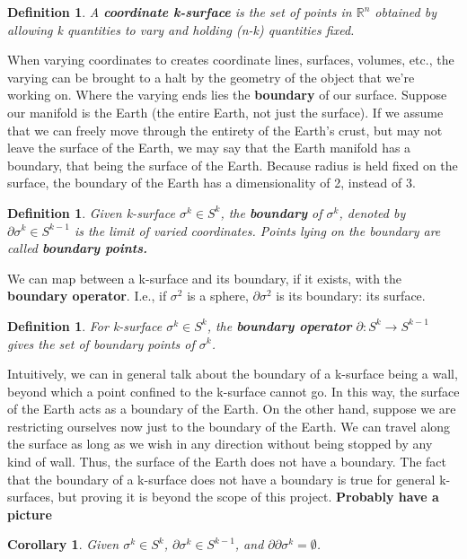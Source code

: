 \documentclass{book}
\newtheorem{defn}[equation]{Definition}
\newtheorem{coro}[equation]{Corollary}
\begin{document}
\begin{defn}
	A \textbf{coordinate k-surface} is the set of points in $\mathbb{R}^n$ obtained by allowing k quantities to vary and holding (n-k) quantities fixed.  
\end{defn}

When varying coordinates to creates coordinate lines, surfaces, volumes, etc., the varying can be brought to a halt by the geometry of the object that we're working on. Where the varying ends lies the \textbf{boundary} of our surface. Suppose our manifold is the Earth (the entire Earth, not just the surface). If we assume that we can freely move through the entirety of the Earth's crust, but may not leave the surface of the Earth, we may say that the Earth manifold has a boundary, that being the surface of the Earth. Because radius is held fixed on the surface, the boundary of the Earth has a dimensionality of 2, instead of 3. 

\begin{defn}
	Given k-surface $\sigma^k \in S^k$, the \textbf{boundary} of $\sigma^k$, denoted by $\partial\sigma^k \in S^{k-1}$ is the limit of varied coordinates. Points lying on the boundary are called \textbf{boundary points.}
\end{defn}

We can map between a k-surface and its boundary, if it exists, with the \textbf{boundary operator}. I.e., if $\sigma^2$ is a sphere, $\partial \sigma^2$ is its boundary: its surface. 

\begin{defn}
	For k-surface $\sigma^k \in S^k$, the \textbf{boundary operator} $\partial : S^k \to S^{k-1}$ gives the set of boundary points of $\sigma^k$. 
\end{defn}

Intuitively, we can in general talk about the boundary of a k-surface being a wall, beyond which a point confined to the k-surface cannot go. In this way, the surface of the Earth acts as a boundary of the Earth. On the other hand, suppose we are restricting ourselves now just to the boundary of the Earth. We can travel along the surface as long as we wish in any direction without being stopped by any kind of wall. Thus, the surface of the Earth does not have a boundary. The fact that the boundary of a k-surface does not have a boundary is true for general k-surfaces, but proving it is beyond the scope of this project. \textbf{Probably have a picture}




\begin{coro}
	Given $\sigma^k \in S^k$, $\partial \sigma^k \in S^{k-1}$, and $\partial\partial \sigma^k = \emptyset$. 
\end{coro}
\end{document}
